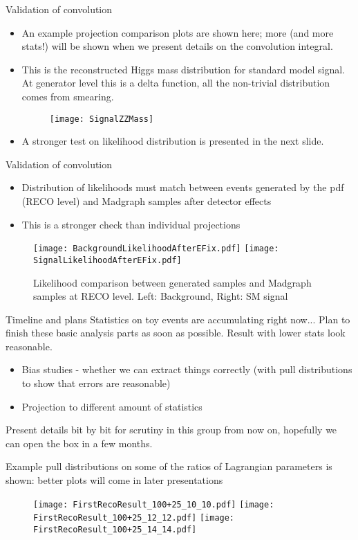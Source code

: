 \documentclass[11pt,t]{beamer}
\begin{document}
\begin{frame}{Validation of convolution}
   \begin{itemize}
   \item An example projection comparison plots are shown here; more (and more stats!) will be shown when we
   present details on the convolution integral.
   \item This is the reconstructed Higgs mass distribution for standard model signal.
   At generator level this is a delta function, all the non-trivial distribution comes from smearing.
   \begin{figure}
   \texttt{[image: SignalZZMass]}
   \end{figure}
   \item A stronger test on likelihood distribution is presented in the next slide.
   \end{itemize}
\end{frame}

\begin{frame}{Validation of convolution}
   \begin{itemize}
   \item Distribution of likelihoods must match between events generated by the pdf (RECO level)
   and Madgraph samples after detector effects
   \item This is a stronger check than individual projections
   \end{itemize}
   \begin{figure}
   \texttt{[image: BackgroundLikelihoodAfterEFix.pdf]}
   \texttt{[image: SignalLikelihoodAfterEFix.pdf]}
   \caption{Likelihood comparison between generated samples and Madgraph samples at RECO level.
   Left: Background, Right: SM signal}
   \end{figure}
\end{frame}

\begin{frame}{Timeline and plans}
   Statistics on toy events are accumulating right now...  Plan to finish these basic analysis parts as soon as possible.
   Result with lower stats look reasonable.
   \begin{itemize}
   \item Bias studies - whether we can extract things correctly (with pull distributions to show that errors are reasonable)
   \item Projection to different amount of statistics
   \end{itemize}
   Present details bit by bit for scrutiny in this group from now on, hopefully we can open the box in a few months.

   Example pull distributions on some of the ratios of Lagrangian parameters is shown: better plots will come in later presentations
   \begin{figure}
   \texttt{[image: FirstRecoResult\_100+25\_10\_10.pdf]}
   \texttt{[image: FirstRecoResult\_100+25\_12\_12.pdf]}
   \texttt{[image: FirstRecoResult\_100+25\_14\_14.pdf]}
   \end{figure}
\end{frame}
\end{document}
